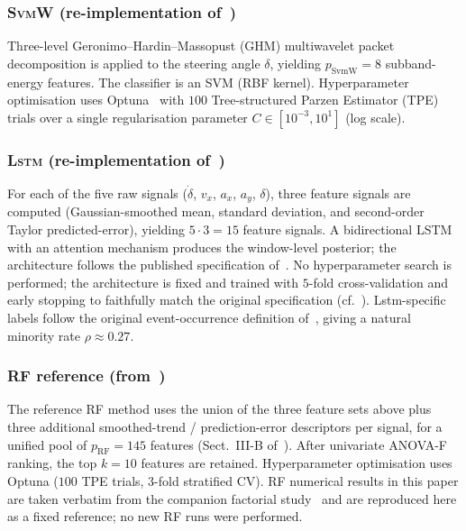 \documentclass[lettersize,journal]{IEEEtran}
\newcommand{\Impl}[1]{\textsc{#1}}
\begin{document}
\subsubsection{\Impl{SvmW} (re-implementation of~\cite{zhao2009})}\label{sec:svmw}
Three-level Geronimo--Hardin--Massopust (GHM) multiwavelet packet decomposition is applied to the steering angle $\delta$, yielding $p_{\text{SvmW}} = 8$ subband-energy features.
The classifier is an SVM (RBF kernel).
Hyperparameter optimisation uses Optuna~\cite{akiba2019} with $100$ Tree-structured Parzen Estimator (TPE) trials over a single regularisation parameter $C \in [10^{-3}, 10^{1}]$ (log scale).

\subsubsection{\Impl{Lstm} (re-implementation of~\cite{wang2022})}\label{sec:lstm}
For each of the five raw signals ($\dot{\delta}$, $v_x$, $a_x$, $a_y$, $\delta$), three feature signals are computed (Gaussian-smoothed mean, standard deviation, and second-order Taylor predicted-error), yielding $5 \cdot 3 = 15$ feature signals.
A bidirectional LSTM with an attention mechanism produces the window-level posterior; the architecture follows the published specification of~\cite{wang2022}.
No hyperparameter search is performed; the architecture is fixed and trained with $5$-fold cross-validation and early stopping to faithfully match the original specification (cf.~\cite{nakagama2025iv}).
Lstm-specific labels follow the original event-occurrence definition of~\cite{wang2022}, giving a natural minority rate $\rho \approx 0.27$.

\subsubsection{\Impl{RF} reference (from~\cite{nakagama2025iv,nakagama2025factorial})}\label{sec:rf_ref}
The reference \Impl{RF} method uses the union of the three feature sets above plus three additional smoothed-trend / prediction-error descriptors per signal, for a unified pool of $p_{\text{RF}} = 145$ features (Sect.~III-B of~\cite{nakagama2025factorial}).
After univariate ANOVA-F ranking, the top $k=10$ features are retained.
Hyperparameter optimisation uses Optuna ($100$ TPE trials, $3$-fold stratified CV).
\Impl{RF} numerical results in this paper are taken verbatim from the companion factorial study~\cite{nakagama2025factorial} and are reproduced here as a fixed reference; no new \Impl{RF} runs were performed.
\end{document}
